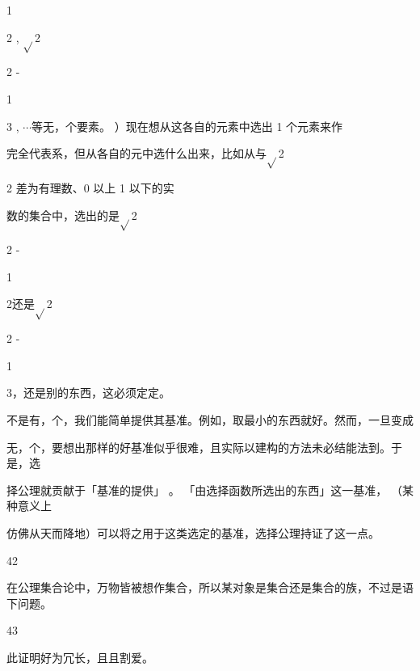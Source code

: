 1\par
2 , $\sqrt{}$2\par
2 -\par
1\par
3 , $\cdots$等无，个要素。 ）现在想从这各自的元素中选出 1 个元素来作\par
完全代表系，但从各自的元中选什么出来，比如从与$\sqrt{}$2\par
2 差为有理数、0 以上 1 以下的实\par
数的集合中，选出的是$\sqrt{}$2\par
2 -\par
1\par
2还是$\sqrt{}$2\par
2 -\par
1\par
3，还是别的东西，这必须定定。\par
不是有，个，我们能简单提供其基准。例如，取最小的东西就好。然而，一旦变成\par
无，个，要想出那样的好基准似乎很难，且实际以建构的方法未必结能法到。于是，选\par
择公理就贡献于「基准的提供」 。 「由选择函数所选出的东西」这一基准， （某种意义上\par
仿佛从天而降地）可以将之用于这类选定的基准，选择公理持证了这一点。\par
42\par
在公理集合论中，万物皆被想作集合，所以某对象是集合还是集合的族，不过是语下问题。\par
43\par
此证明好为冗长，且且割爱。\par

